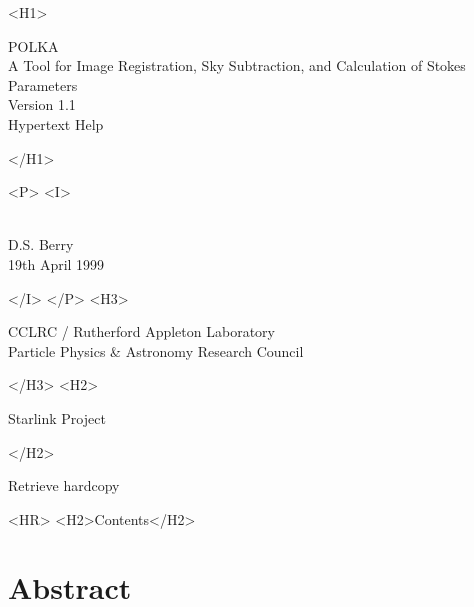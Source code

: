 \documentclass[11pt]{article}
\newcommand{\stardoccategory}  {}
\newcommand{\stardocsource}    {}
\newcommand{\stardocnumber}    {}
\newcommand{\stardocauthors}   {D.S. Berry}
\newcommand{\stardocdate}      {19th April 1999}
\newcommand{\stardoctitle}     {POLKA \\ [1ex]
                                A Tool for Image Registration, Sky Subtraction,
                                and Calculation of Stokes Parameters}
\newcommand{\stardocversion}   {Version 1.1}
\newcommand{\stardocmanual}    {Hypertext Help}
\newcommand{\htmladdnormallink}[2]{#1}
\newcommand{\htmladdimg}[1]{}
\newcommand{\htmlref}[2]{#1}
\newcommand{\htmladdtonavigation}[1]{}
\newcommand{\xlabel}[1]{}
\newcommand{\latexonlytoc}[0]{\tableofcontents}
\begin{document}
\begin{htmlonly}
   \xlabel{}
   \begin{rawhtml} <H1> \end{rawhtml}
      \stardoctitle\\
      \stardocversion\\
      \stardocmanual
   \begin{rawhtml} </H1> \end{rawhtml}


   \begin{rawhtml} <P> <I> \end{rawhtml}
   \stardoccategory\ \stardocnumber \\
   \stardocauthors \\
   \stardocdate
   \begin{rawhtml} </I> </P> <H3> \end{rawhtml}
      \htmladdnormallink{CCLRC}{http://www.cclrc.ac.uk} /
      \htmladdnormallink{Rutherford Appleton Laboratory}
                        {http://www.cclrc.ac.uk/ral} \\
      \htmladdnormallink{Particle Physics \& Astronomy Research Council}
                        {http://www.pparc.ac.uk} \\
   \begin{rawhtml} </H3> <H2> \end{rawhtml}
      \htmladdnormallink{Starlink Project}{http://www.starlink.ac.uk/}
   \begin{rawhtml} </H2> \end{rawhtml}
   \htmladdnormallink{\htmladdimg{source.gif} Retrieve hardcopy}
      {http://www.starlink.ac.uk/cgi-bin/hcserver?\stardocsource}\\

  \label{stardoccontents}
  \begin{rawhtml}
    <HR>
    <H2>Contents</H2>
  \end{rawhtml}
  \renewcommand{\latexonlytoc}[0]{}
  \htmladdtonavigation{\htmlref{\htmladdimg{contents_motif.gif}}
        {stardoccontents}}

  \section{\xlabel{abstract}Abstract}


\end{htmlonly}
\end{document}
